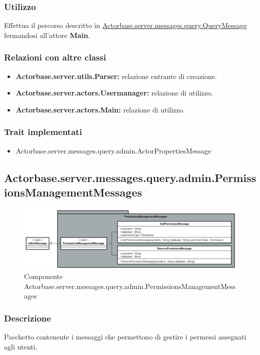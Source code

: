 \documentclass[a4paper]{article}
\begin{document}
			\subsubsection{Utilizzo}
				Effettua il percorso descritto in \hyperref[QueryMessage]{Actorbase.server.messages.query.QueryMessage} fermandosi all'attore 
				\textbf{Main}.
				
			\subsubsection{Relazioni con altre classi}
				\begin{itemize}
					\item \textbf{Actorbase.server.utils.Parser:} relazione entrante di creazione.
					\item \textbf{Actorbase.server.actors.Usermanager:} relazione di utilizzo.
					\item \textbf{Actorbase.server.actors.Main:} relazione di utilizzo.
				\end{itemize}
			\subsubsection{Trait implementati}
				\begin{itemize}
					\item Actorbase.server.messages.query.admin.ActorPropertiesMessage
				\end{itemize}
				
		\subsection{Actorbase.server.messages.query.admin.PermissionsManagementMessages}
		
			\begin{figure}[H]
				\centering
				\includegraphics[width=\textwidth]{ST/Server/userPermissionsManagementLevel.jpg}
				\caption{Componente Actorbase.server.messages.query.admin.PermissionsManagementMessages}
			\end{figure}
			
			\subsubsection{Descrizione}
				Pacchetto contenente i messaggi che permettono di gestire i permessi assegnati agli utenti.
\end{document}
